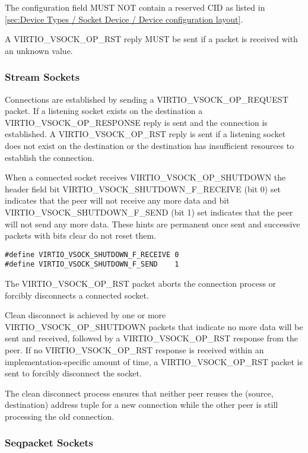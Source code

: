 The  configuration field MUST NOT contain a reserved CID as listed in \ref{sec:Device Types / Socket Device / Device configuration layout}.

A VIRTIO_VSOCK_OP_RST reply MUST be sent if a packet is received with an
unknown  value.

\subsubsection{Stream Sockets}\label{sec:Device Types / Socket Device / Device Operation / Stream Sockets}

Connections are established by sending a VIRTIO_VSOCK_OP_REQUEST packet. If a
listening socket exists on the destination a VIRTIO_VSOCK_OP_RESPONSE reply is
sent and the connection is established.  A VIRTIO_VSOCK_OP_RST reply is sent if
a listening socket does not exist on the destination or the destination has
insufficient resources to establish the connection.

When a connected socket receives VIRTIO_VSOCK_OP_SHUTDOWN the header
 field bit VIRTIO_VSOCK_SHUTDOWN_F_RECEIVE (bit 0) set indicates
that the peer will not receive any more data and bit VIRTIO_VSOCK_SHUTDOWN_F_SEND
(bit 1) set indicates that the peer will not send any more data.  These hints are
permanent once sent and successive packets with bits clear do not reset them.

\begin{lstlisting}
#define VIRTIO_VSOCK_SHUTDOWN_F_RECEIVE 0
#define VIRTIO_VSOCK_SHUTDOWN_F_SEND    1
\end{lstlisting}

The VIRTIO_VSOCK_OP_RST packet aborts the connection process or forcibly
disconnects a connected socket.

Clean disconnect is achieved by one or more VIRTIO_VSOCK_OP_SHUTDOWN packets
that indicate no more data will be sent and received, followed by a
VIRTIO_VSOCK_OP_RST response from the peer.  If no VIRTIO_VSOCK_OP_RST response
is received within an implementation-specific amount of time, a
VIRTIO_VSOCK_OP_RST packet is sent to forcibly disconnect the socket.

The clean disconnect process ensures that neither peer reuses the (source,
destination) address tuple for a new connection while the other peer is still
processing the old connection.

\subsubsection{Seqpacket Sockets}\label{sec:Device Types / Socket Device / Device Operation / Seqpacket Sockets}


